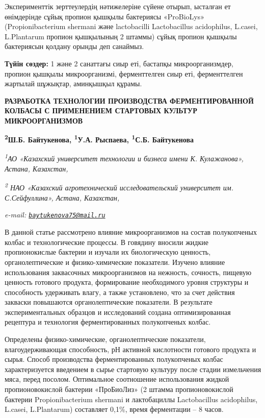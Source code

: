 Эксперименттік зерттеулердің нәтижелеріне сүйене отырып, ысталған ет
өнімдерінде сұйық пропион қышқылы бактериясы «ProBioLys»
(Propionibacterium shermani және lactobacilli Lactobacillus acidophilus,
L.casei, L.Plantarum пропион қышқылының 2 штаммы) сұйық пропион қышқылы
бактериясын қолдану орынды деп санаймыз.

{\bfseries Түйін сөздер:} 1 және 2 санаттағы сиыр еті, бастапқы
микроорганизмдер, пропион қышқылы микроорганизмі, ферменттелген сиыр
еті, ферменттелген жартылай шұжықтар, аминқышқыл құрамы.

{\bfseries РАЗРАБОТКА ТЕХНОЛОГИИ ПРОИЗВОДСТВА ФЕРМЕНТИРОВАННОЙ КОЛБАСЫ С
ПРИМЕНЕНИЕМ СТАРТОВЫХ КУЛЬТУР МИКРООРГАНИЗМОВ}

{\bfseries \textsuperscript{2}Ш.Б. Байтукенова\textsuperscript{\envelope },
\textsuperscript{1}У.А. Рыспаева, \textsuperscript{1}С.Б. Байтукенова}

\emph{\textsuperscript{1}АО «Казахский университет технологии и бизнеса
имени К. Кулажанова», Астана, Казахстан,}

\emph{\textsuperscript{2} НАО «Казахский агротехнический
исследовательский университет им. С.Сейфуллина», Астана, Казахстан,}

\emph{e-mail:
\href{mailto:baytukenova75@mail.ru}{\nolinkurl{baytukenova75@mail.ru}}}

В данной статье рассмотрено влияние микроорганизмов на состав
полукопченых колбас и технологические процессы. В говядину вносили
жидкие пропионокислые бактерии и изучали их биологическую ценность,
органолептические и физико-химические показатели. Изучено влияние
использования заквасочных микроорганизмов на нежность, сочность, пищевую
ценность готового продукта, формирование необходимого уровня структуры и
способность удерживать влагу, а также установлено, что за счет действия
закваски повышаются органолептические показатели. В результате
экспериментальных образцов и исследований создана оптимизированная
рецептура и технология ферментированных полукопченых колбас.

Определены физико-химические, органолептические показатели,
влагоудерживающая способность, рН активной кислотности готового продукта
и сырья. Способ производства ферментированных полукопченых колбас
характеризуется введением в сырье стартовую культуру после стадии
измельчения мяса, перед посолом. Оптимальное соотношение использования
жидкой пропионовокислой бактерии «ПроБиоЛиз» (2 штамма пропионовокислой
бактерии Propionibacterium shermani и лактобациллы Lactobacillus
acidophilus, L.casei, L.Plantarum) составляет 0,1\%, время ферментации
-- 8 часов.

